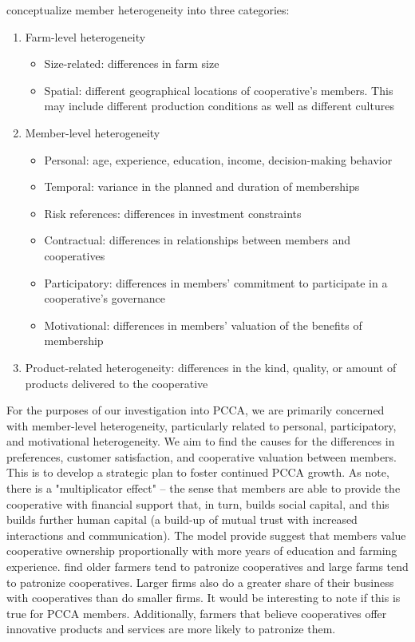 \documentclass[a4paper]{article}
\begin{document}
\citet{hohlerDimensionsMemberHeterogeneity2018} conceptualize member heterogeneity into three categories:
\begin{enumerate}[noitemsep]
	\item Farm-level heterogeneity
	\begin{itemize}[noitemsep]
		\item Size-related: differences in farm size
		\item Spatial: different geographical locations of cooperative's members. This may include different production conditions as well as different cultures
	\end{itemize}
	\item Member-level heterogeneity
	\begin{itemize}[noitemsep]
		\item Personal: age, experience, education, income, decision-making behavior
		\item Temporal: variance in the planned and duration of memberships
		\item Risk references: differences in investment constraints
		\item Contractual: differences in relationships between members and cooperatives
		\item Participatory: differences in members' commitment to participate in a cooperative's governance
		\item Motivational: differences in members' valuation of the benefits of membership
	\end{itemize}
	\item Product-related heterogeneity: differences in the kind, quality, or amount of products delivered to the cooperative
\end{enumerate}

For the purposes of our investigation into PCCA, we are primarily concerned with member-level heterogeneity, particularly related to personal, participatory, and motivational heterogeneity. We aim to find the causes for the differences in preferences, customer satisfaction, and cooperative valuation between members. This is to develop a strategic plan to foster continued PCCA growth. As \citet{nilssonAreLargeComplex2012} note, there is a "multiplicator effect" -- the sense that members are able to provide the cooperative with financial support that, in turn, builds social capital, and this builds further human capital (a build-up of mutual trust with increased interactions and communication). The model \citet{munchAssessingValueCooperative2021} provide suggest that members value cooperative ownership proportionally with more years of education and farming experience. \citet{kleinDeterminantsCooperativePatronage1997} find older farmers tend to patronize cooperatives and large farms tend to patronize cooperatives. Larger firms also do a greater share of their business with cooperatives than do smaller firms. It would be interesting to note if this is true for PCCA members. Additionally, farmers that believe cooperatives offer innovative products and services are more likely to patronize them. 
\end{document}
